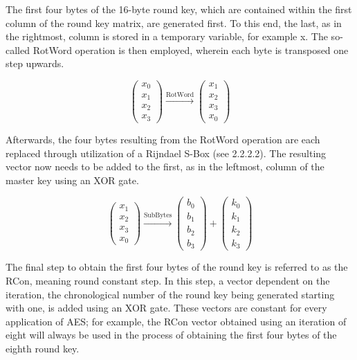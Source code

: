 \documentclass[12pt]{report}
\theoremstyle{definition}
\theoremstyle{remark}
\begin{document}
The first four bytes of the 16-byte round key, which are contained within the first column of the round key matrix, are generated first. To this end, the last, as in the rightmost, column is stored in a temporary variable, for example x. The so-called RotWord operation is then employed, wherein each byte is transposed one step upwards.

\[
\left( \begin{array}{c}
x_0 \\
x_1 \\
x_2 \\
x_3\end{array} \right)
\xrightarrow{\text{RotWord}}
\left( \begin{array}{c}
x_1 \\
x_2 \\
x_3 \\
x_0\end{array} \right)
\]

Afterwards, the four bytes resulting from the RotWord operation are each replaced through utilization of a Rijndael S-Box (see  2.2.2.2). The resulting vector now needs to be added to the first, as in the leftmost, column of the master key using an XOR gate.

\[
\left( \begin{array}{c}
x_1 \\
x_2 \\
x_3 \\
x_0\end{array} \right)
\xrightarrow{\text{SubBytes}}
\left( \begin{array}{c}
b_0 \\
b_1 \\
b_2 \\
b_3\end{array} \right)
+
\left( \begin{array}{c}
k_0 \\
k_1 \\
k_2 \\
k_3\end{array} \right)
\]

The final step to obtain the first four bytes of the round key is referred to as the RCon, meaning round constant step\cite[p. 15]{Rijndael}. In this step, a vector dependent on the iteration, the chronological number of the round key being generated starting with one, is added using an XOR gate. These vectors are constant for every application of AES; for example, the RCon vector obtained using an iteration of eight will always be used in the process of obtaining the first four bytes of the eighth round key.
\end{document}
